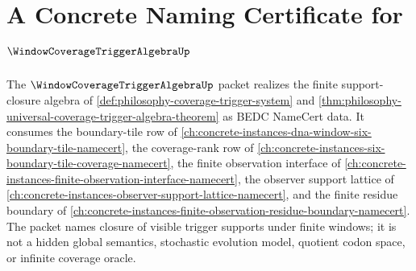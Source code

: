 \chapter{A Concrete Naming Certificate for $\WindowCoverageTriggerAlgebraUp$}
\label{ch:concrete-instances-window-coverage-trigger-algebra-namecert}

The $\WindowCoverageTriggerAlgebraUp$ packet realizes the finite support-closure algebra of \autoref{def:philosophy-coverage-trigger-system} and \autoref{thm:philosophy-universal-coverage-trigger-algebra-theorem} as BEDC NameCert data. It consumes the boundary-tile row of \autoref{ch:concrete-instances-dna-window-six-boundary-tile-namecert}, the coverage-rank row of \autoref{ch:concrete-instances-six-boundary-tile-coverage-namecert}, the finite observation interface of \autoref{ch:concrete-instances-finite-observation-interface-namecert}, the observer support lattice of \autoref{ch:concrete-instances-observer-support-lattice-namecert}, and the finite residue boundary of \autoref{ch:concrete-instances-finite-observation-residue-boundary-namecert}. The packet names closure of visible trigger supports under finite windows; it is not a hidden global semantics, stochastic evolution model, quotient codon space, or infinite coverage oracle.

